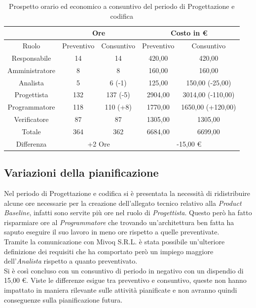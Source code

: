 \documentclass[./PianodiProgetto.tex]{subfiles}
\begin{document}
\begin{table}[H]
	\centering
	\begin{tabular}{|c|c|c|c|c|}
		\hline
		& \multicolumn{2}{c|}{Ore} & \multicolumn{2}{c|}{Costo in \euro{}}  \\ \hline
		Ruolo&Preventivo&Consuntivo&Preventivo&Consuntivo \\ \hline
		Responsabile&14&14&420,00&420,00 \\ \hline
		Amministratore&8&8&160,00&160,00 \\ \hline
		Analista&5&6 (-1)&125,00&150,00 (-25,00)\\ \hline
		Progettista&132&137 (-5)&2904,00&3014,00 (-110,00) \\ \hline
		Programmatore&118&110 (+8)&1770,00&1650,00 (+120,00) \\ \hline
		Verificatore&87&87&1305,00&1305,00 \\ \hline
		Totale&364&362&6684,00&6699,00 \\ \hline
		Differenza& \multicolumn{2}{c|}{+2 Ore} & \multicolumn{2}{c|}{-15,00 \euro{}} \\ \hline
	\end{tabular}
	\caption{Prospetto orario ed economico a consuntivo del periodo di Progettazione e codifica}
\end{table}

\subsection{Variazioni della pianificazione}
Nel periodo di Progettazione e codifica si è presentata la necessità di ridistribuire alcune ore necessarie per la creazione dell'allegato tecnico relativo alla \textit{Product Baseline}, infatti sono servite più ore nel ruolo di \textit{Progettista}. Questo però ha fatto risparmiare ore al \textit{Programmatore} che trovando un'architettura ben fatta ha saputo eseguire il suo lavoro in meno ore rispetto a quelle preventivate. \\
Tramite la comunicazione con Mivoq S.R.L. è stata possibile un'ulteriore definizione dei requisiti che ha comportato però un impiego maggiore dell'\textit{Analista} rispetto a quanto preventivato. \\
Si è così concluso con un consuntivo di periodo in negativo con un dispendio di 15,00 \euro{}. Viste le differenze esigue tra preventivo e consuntivo, queste non hanno impattato in maniera rilevante sulle attività pianificate e non avranno quindi conseguenze sulla pianificazione futura.
\end{document}

